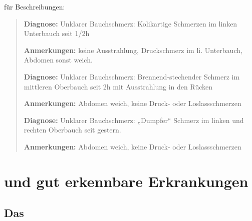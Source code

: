 {für Beschreibungen:
\begin{quote}
{\sffamily\bfseries Diagnose:} {\ttfamily Unklarer
Bauchschmerz: Kolikartige Schmerzen im linken Unterbauch seit 1/2h }

{\sffamily\bfseries Anmerkungen:} {\ttfamily keine
Ausstrahlung, Druckschmerz im li. Unter\-bauch, Abdomen sonst 
weich.}
\vspace{0.5em}

{\sffamily\bfseries Diagnose:} {\ttfamily Unklarer
Bauchschmerz: Brennend-stechender Schmerz im mittleren
Oberbauch seit 2h mit Ausstrahlung in den Rücken}

{\sffamily\bfseries Anmerkungen:} {\ttfamily Abdomen weich,
keine Druck- oder Loslassschmerzen}
\vspace{0.5em}

{\sffamily\bfseries Diagnose:} {\ttfamily Unklarer
Bauchschmerz: „Dumpfer“ Schmerz im linken und rechten
Oberbauch seit gestern. }

{\sffamily\bfseries Anmerkungen:} {\ttfamily Abdomen
weich, keine Druck- oder Loslassschmerzen}
\end{quote}
}{

}{}{}{}





\section{ und gut erkennbare Erkrankungen}



\subsection{Das }
\label{topic:akutes-abdomen}





